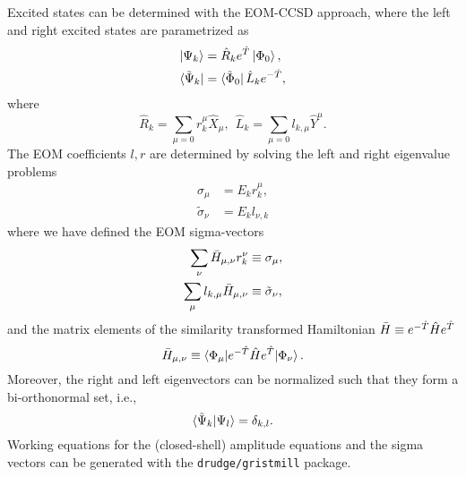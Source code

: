 \documentclass{article}
\begin{document}
Excited states can be determined with the EOM-CCSD approach, where the left and right excited states are parametrized as 
\begin{align}
    \ket{\Psi_k} &= \hat{R}_k e^{\hat{T}} \ket{\Phi_0}, \\
    \bra{\tilde{\Psi}_k} &= \bra{\tilde{\Phi}_0}\hat{L}_ke^{-\hat{T}},
\end{align}
where 
\begin{equation}
    \hat{R}_k = \sum_{\mu=0} r_k^\mu \hat{X}_\mu, \ \ \hat{L}_k = \sum_{\mu=0} l_{k,\mu} \hat{Y}^\mu.
\end{equation}
The EOM coefficients $l, r$ are determined by solving the left and right eigenvalue problems
\begin{align}
    \sigma_\mu &=  E_k r^\mu_k, \\
    \tilde{\sigma}_\nu &= E_k l_{\nu,k} 
\end{align}
where we have defined the EOM sigma-vectors
\begin{align}
     \sum_{\nu} \Bar{H}_{\mu,\nu} r^\nu_k &\equiv \sigma_\mu \label{sigma-EOM},\\
   \sum_{\mu} l_{k,\mu}\Bar{H}_{\mu,\nu} &\equiv \tilde{\sigma}_\nu \label{tilde-sigma-EOM},
\end{align}
and the matrix elements of the similarity transformed Hamiltonian $\Bar{H} \equiv e^{-\hat{T}}\hat{H}e^{\hat{T}}$
\begin{equation}
    \Bar{H}_{\mu, \nu} \equiv \braket{\Phi_\mu|e^{-\hat{T}}\hat{H}e^{\hat{T}}|\Phi_\nu}.
\end{equation}
Moreover, the right and left eigenvectors can be normalized such that they form a bi-orthonormal set, i.e., 
\begin{equation}
    \braket{\tilde{\Psi}_k|\Psi_l} = \delta_{k,l}.
\end{equation}
Working equations for the (closed-shell) amplitude equations and the sigma vectors can be generated with the \texttt{drudge/gristmill} package.

\begin{appendix}

\end{appendix}
\printbibliography
\end{document}
